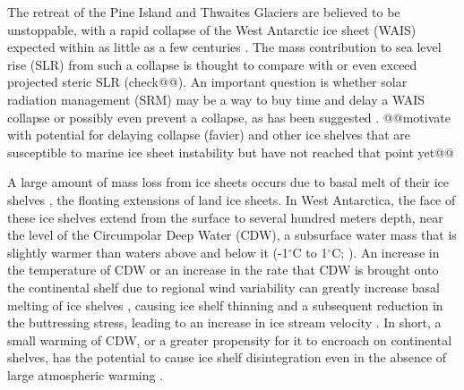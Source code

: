 \documentclass{nature}
\begin{document}
The retreat of the Pine Island and Thwaites Glaciers are believed to be unstoppable, with a rapid collapse of the West Antarctic ice sheet (WAIS) expected within as little as a few centuries \cite{joughin14,rignot14,favier14}. The mass contribution to sea level rise (SLR) from such a collapse is thought to compare with or even exceed projected steric SLR (check@@). An important question is whether solar radiation management (SRM) may be a way to buy time and delay a WAIS collapse or possibly even prevent a collapse, as has been suggested \cite{blackstock09}. @@motivate with potential for delaying collapse (favier) and other ice shelves that are susceptible to marine ice sheet instability but have not reached that point yet@@

A large amount of mass loss from ice sheets occurs due to basal melt of their ice shelves \cite{joughin11}, the floating extensions of land ice sheets. In West Antarctica, the face of these ice shelves extend from the surface to several hundred meters depth, near the level of the Circumpolar Deep Water (CDW), a subsurface water mass that is slightly warmer than waters above and below it (-1$^\circ$C to 1$^\circ$C; \cite{yin11}). An increase in the temperature of CDW or an increase in the rate that CDW is brought onto the continental shelf due to regional wind variability can greatly increase basal melting of ice shelves \cite{thoma08,joughin11}, causing ice shelf thinning and a subsequent reduction in the buttressing stress, leading to an increase in ice stream velocity \cite{oppenheimer98}. In short, a small warming of CDW, or a greater propensity for it to encroach on continental shelves, has the potential to cause ice shelf disintegration even in the absence of large atmospheric warming \cite{oppenheimer98}. %
\end{document}
